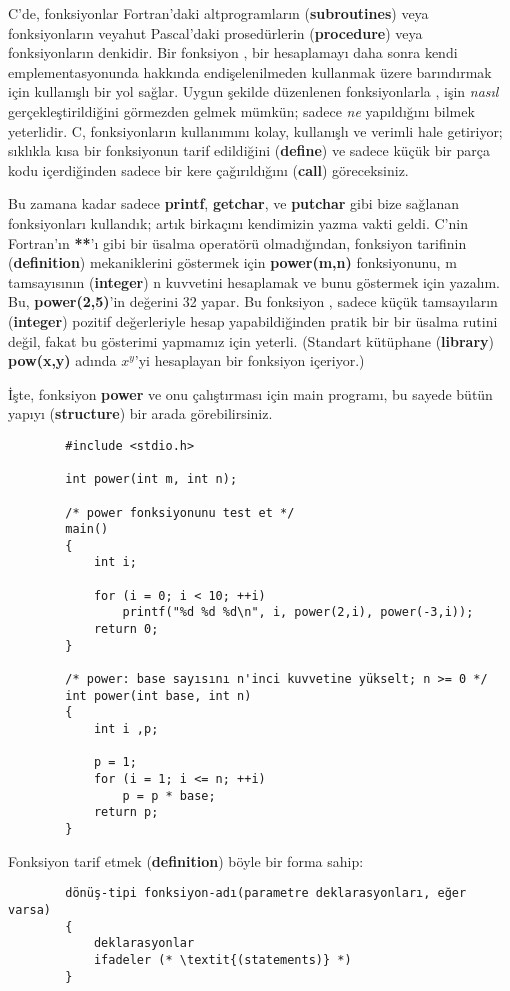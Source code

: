 \documentclass[a4paper,12pt,oneside]{book}
\begin{document}
C'de, fonksiyonlar  Fortran'daki altprogramların (\textbf{subroutines}) veya fonksiyonların  veyahut Pascal'daki prosedürlerin (\textbf{procedure}) veya fonksiyonların  denkidir. Bir fonksiyon , bir hesaplamayı daha sonra kendi emplementasyonunda hakkında endişelenilmeden kullanmak üzere barındırmak için kullanışlı bir yol sağlar. Uygun şekilde düzenlenen fonksiyonlarla , işin \textit{nasıl} gerçekleştirildiğini görmezden gelmek mümkün; sadece \textit{ne} yapıldığını bilmek yeterlidir. C, fonksiyonların  kullanımını kolay, kullanışlı ve verimli hale getiriyor; sıklıkla kısa bir fonksiyonun  tarif edildiğini (\textbf{define}) ve sadece küçük bir parça kodu içerdiğinden sadece bir kere çağırıldığını (\textbf{call}) göreceksiniz.
\par Bu zamana kadar sadece \textbf{printf}, \textbf{getchar}, ve \textbf{putchar} gibi bize sağlanan fonksiyonları  kullandık; artık birkaçını kendimizin yazma vakti geldi. C'nin Fortran'ın \textbf{**}'ı gibi bir üsalma operatörü olmadığından, fonksiyon  tarifinin (\textbf{definition}) mekaniklerini göstermek için \textbf{power(m,n)} fonksiyonunu, m tamsayısının (\textbf{integer}) n kuvvetini hesaplamak ve bunu göstermek için yazalım. Bu, \textbf{power(2,5)}'in değerini 32 yapar. Bu fonksiyon , sadece küçük tamsayıların (\textbf{integer}) pozitif değerleriyle hesap yapabildiğinden pratik bir bir üsalma rutini değil, fakat bu gösterimi yapmamız için yeterli. (Standart kütüphane (\textbf{library}) \textbf{pow(x,y)} adında \textbf{$x^y$}'yi hesaplayan bir fonksiyon  içeriyor.)
\par İşte, fonksiyon  \textbf{power} ve onu çalıştırması için main programı, bu sayede bütün yapıyı (\textbf{structure}) bir arada görebilirsiniz.
\begin{lstlisting}
		#include <stdio.h>

		int power(int m, int n);

		/* power fonksiyonunu test et */
		main()
		{
			int i;

			for (i = 0; i < 10; ++i)
				printf("%d %d %d\n", i, power(2,i), power(-3,i));
			return 0;
		}

		/* power: base sayısını n'inci kuvvetine yükselt; n >= 0 */
		int power(int base, int n)
		{
			int i ,p;

			p = 1;
			for (i = 1; i <= n; ++i)
				p = p * base;
			return p;
		}
\end{lstlisting}
Fonksiyon  tarif etmek (\textbf{definition}) böyle bir forma sahip:
\begin{lstlisting}
		dönüş-tipi fonksiyon-adı(parametre deklarasyonları, eğer varsa)
		{
			deklarasyonlar
			ifadeler (* \textit{(statements)} *)
		}
\end{lstlisting}
\end{document}
